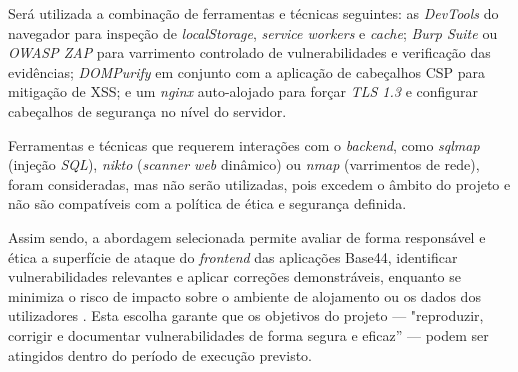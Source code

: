 Será utilizada a combinação de ferramentas e técnicas seguintes:
as \textit{DevTools} do navegador para inspeção de \textit{localStorage},
\textit{service workers} \cite{ref8} e \textit{cache};
\textit{Burp Suite} ou \textit{OWASP ZAP} \cite{ref23} para varrimento controlado
de vulnerabilidades e verificação das evidências;
\textit{DOMPurify} em conjunto com a aplicação de cabeçalhos CSP \cite{ref25}
para mitigação de XSS;
e um \textit{nginx} auto-alojado para forçar \textit{TLS 1.3}
e configurar cabeçalhos de segurança \cite{ref19} no nível do servidor.

Ferramentas e técnicas que requerem interações com o \textit{backend},
como \textit{sqlmap} (injeção \textit{SQL}), \textit{nikto} (\textit{scanner web} dinâmico)
ou \textit{nmap} (varrimentos de rede), foram consideradas, mas não serão utilizadas,
pois excedem o âmbito do projeto e não são compatíveis com a política de ética e segurança definida.

Assim sendo, a abordagem selecionada permite avaliar de forma responsável e ética
a superfície de ataque do \textit{frontend} das aplicações Base44,
identificar vulnerabilidades relevantes e aplicar correções demonstráveis,
enquanto se minimiza o risco de impacto sobre o ambiente de alojamento
ou os dados dos utilizadores \cite{ref27}.
Esta escolha garante que os objetivos do projeto — "reproduzir, corrigir e documentar
vulnerabilidades de forma segura e eficaz” — podem ser atingidos
dentro do período de execução previsto.

\newpage